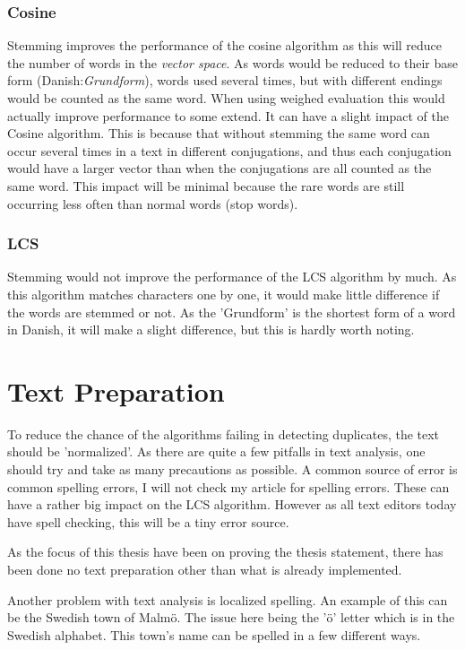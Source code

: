 \subsubsection{Cosine}
Stemming improves the performance of the cosine algorithm as this will reduce the number of words in the \textit{vector space}. As words would be reduced to their base form (Danish:\textit{Grundform}), words used several times, but with different endings would be counted as the same word. When using weighed evaluation this would actually improve performance to some extend. It can have a slight impact of the Cosine algorithm. This is because that without stemming the same word can occur several times in a text in different conjugations, and thus each conjugation would have a larger vector than when the conjugations are all counted as the same word. This impact will be minimal because the rare words are still occurring less often than normal words (stop words).

\subsubsection{LCS}
Stemming would not improve the performance of the LCS algorithm by much. As this algorithm matches characters one by one, it would make little difference if the words are stemmed or not. As the 'Grundform' is the shortest form of a word in Danish, it will make a slight difference, but this is hardly worth noting.

\section{Text Preparation}
\label{TextPrep}
To reduce the chance of the algorithms failing in detecting duplicates, the text should be 'normalized'. As there are quite a few pitfalls in text analysis, one should try and take as many precautions as possible. A common source of error is common spelling errors, I will not check my article for spelling errors. These can have a rather big impact on the LCS algorithm. However as all text editors today have spell checking, this will be a tiny error source.

As the focus of this thesis have been on proving the thesis statement, there has been done no text preparation other than what is already implemented.

Another problem with text analysis is localized spelling. An example of this can be the Swedish town of Malmö. The issue here being the 'ö' letter which is in the Swedish alphabet. This town's name can be spelled in a few different ways.


